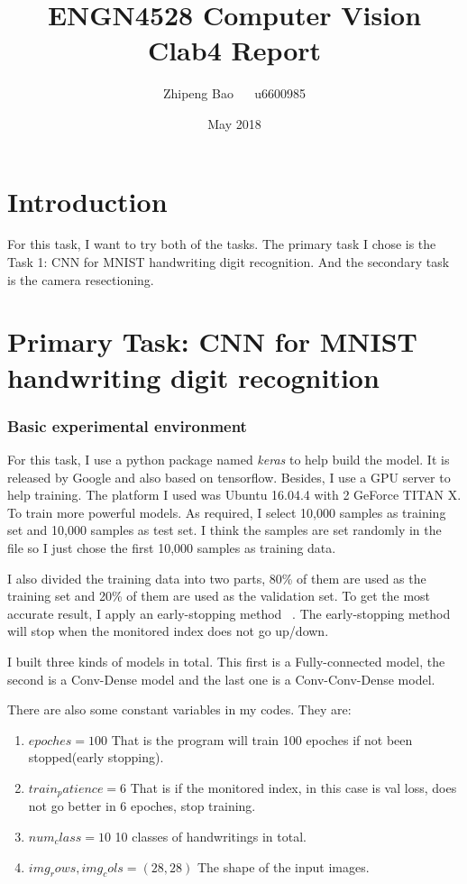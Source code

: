 \documentclass{article}
\title{ENGN4528 Computer Vision Clab4 Report}
\author{Zhipeng Bao ~~ u6600985}
\date{May 2018}
\begin{document}
\maketitle
\section*{Introduction}
For this task, I want to try both of the tasks. The primary task I chose is the Task 1: CNN for MNIST handwriting digit recognition. And the secondary task is the camera resectioning.

\section*{Primary Task:  CNN for MNIST handwriting digit recognition}

\subsubsection*{Basic experimental environment}

For this task, I use a python package named \emph{keras} to help build the model. It is released by Google and also based on tensorflow. Besides, I use a GPU server to help training. The platform I used was Ubuntu 16.04.4 with 2 GeForce TITAN X. To train more powerful models. As required, I select 10,000 samples as training set and 10,000 samples as test set. I think the samples are set randomly in the file so I just chose the first 10,000 samples as training data.

I also divided the training data into two parts, 80\% of them are used as the training set and 20\% of them are used as the validation set. To get the most accurate result, I apply an early-stopping method ~\cite{early_stopping}. The early-stopping method will stop when the monitored index does not go up/down. 

I built three kinds of models in total. This first is a Fully-connected model, the second is a Conv-Dense model and the last one is a Conv-Conv-Dense model.

There are also some constant variables in my codes. They are:

\begin{enumerate}
    \item \textbf{$epoches = 100$} That is the program will train 100 epoches if not been stopped(early stopping). \item \textbf{$train_patience = 6$} That is if the monitored index, in this case is val loss, does not go better in 6 epoches, stop training.
    \item \textbf{$num_class = 10$} 10 classes of handwritings in total.
    \item \textbf{$img_rows, img_cols = (28,28)$} The shape of the input images.
    
\end{enumerate}
\end{document}
